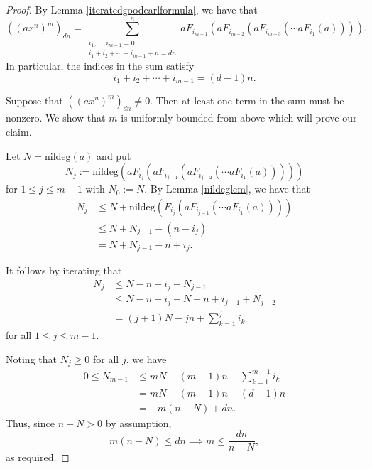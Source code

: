 \documentclass[10pt,a4paper]{amsart}
\begin{document}
\begin{proof}
    By Lemma \ref{iteratedgoodearlformula}, we have that \[
        ((ax^n)^m)_{dn} = \sum_{\substack{i_1,\dots,i_{m-1} = 0\\i_1+i_2+\cdots+i_{m-1} +n = dn}}^n aF_{i_{m-1}}(aF_{i_{m-2}}(aF_{i_{m-3}}(\cdots aF_{i_1}(a)))).
    \]
    In particular, the indices in the sum satisfy\[
        i_1+i_2+\cdots+i_{m-1} = (d-1)n.
    \]
    
    Suppose that $((ax^n)^m)_{dn} \neq 0$. Then at least one term in the sum must be nonzero. We show that $m$ is uniformly bounded from above which will prove our claim. 
    
    Let $N = \text{nildeg}(a)$ and put $$N_j := \text{nildeg}(aF_{i_{j}}(aF_{i_{j-1}}(aF_{i_{j-2}}(\cdots aF_{i_1}(a)))))$$ for $1 \leq j \leq m-1$ with $N_0 := N$. By Lemma \ref{nildeglem}, we have that \begin{align*}
        N_j &\leq N + \text{nildeg}(F_{i_{j}}(aF_{i_{j-1}}(\cdots aF_{i_1}(a)))) \\&\leq N+N_{j-1}-(n-i_j) \\&=N+N_{j-1}-n+i_{j}.\end{align*}

    It follows by iterating that \begin{align*}
        N_j &\leq N-n+i_j+N_{j-1} \\&\leq N-n+i_j +N-n+i_{j-1}+N_{j-2}\\&= (j+1)N-jn+\sum_{k=1}^ji_k\end{align*}for all $1\leq j \leq m-1$.

    Noting that $N_j \geq 0$ for all $j$, we have \begin{align*}
        0\leq N_{m-1}&\leq mN-(m-1)n+\sum_{k=1}^{m-1}i_k \\&= mN- (m-1)n+(d-1)n \\&= -m(n-N)+dn.
    \end{align*} Thus, since $n-N > 0$ by assumption,\[
        m(n-N)\leq dn \implies m \leq \frac{dn}{n-N}, 
    \] as required. 
\end{proof}
\end{document}
